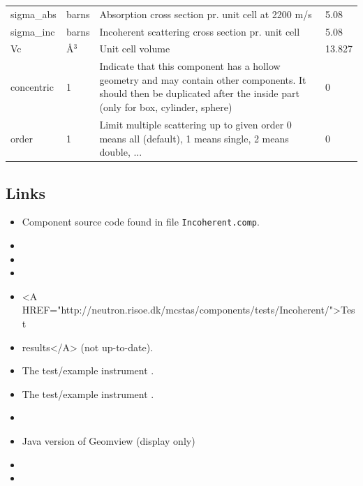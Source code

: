 \begin{longtable}{p{}p{}p{}p{}}
sigma\_abs & barns & Absorption cross section pr. unit cell at 2200 m/s & 5.08 \\
sigma\_inc & barns & Incoherent scattering cross section pr. unit cell & 5.08 \\
Vc & \AA{}$^{3}$ & Unit cell volume & 13.827 \\
concentric & 1 & Indicate that this component has a hollow geometry and may contain other components. It should then be duplicated after the inside part (only for box, cylinder, sphere) & 0 \\
order & 1 & Limit multiple scattering up to given order 0 means all (default), 1 means single, 2 means double, ... & 0 \\
\bottomrule
\end{longtable}

\subsection*{Links}
\begin{itemize}
  \item Component source code found in file \texttt{Incoherent.comp}.
  \item {}
  \item {}
  \item {}
  \item \textless{}A HREF="http://neutron.risoe.dk/mcstas/components/tests/Incoherent/"\textgreater{}Test
  \item results\textless{}/A\textgreater{} (not up-to-date).
  \item The test/example instrument .
  \item The test/example instrument .
  \item {}
  \item Java version of Geomview (display only) 
  \item {}
  \item {}
\end{itemize}
